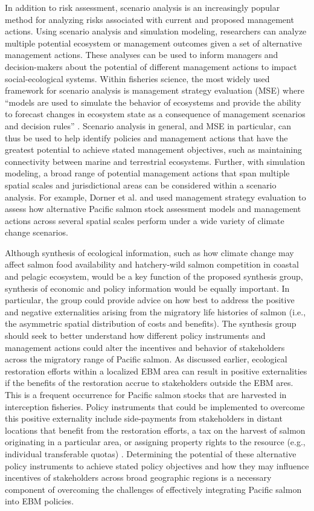 In addition to risk assessment, scenario analysis is an increasingly popular
method for analyzing risks associated with current and proposed management
actions. Using scenario analysis and simulation modeling, researchers can
analyze multiple potential ecosystem or management outcomes given a set of
alternative management actions. These analyses can be used to inform managers
and decision-makers about the potential of different management actions to
impact social-ecological systems. Within fisheries science, the most widely used
framework for scenario analysis is management strategy evaluation (MSE) where
``models are used to simulate the behavior of ecosystems and provide the ability
to forecast changes in ecosystem state as a consequence of management scenarios
and decision rules'' \citep{Levin2009}. Scenario analysis in general, and MSE in
particular, can thus be used to help identify policies and management actions
that have the greatest potential to achieve stated management objectives, such
as maintaining connectivity between marine and terrestrial ecosystems. Further,
with simulation modeling, a broad range of potential management actions that
span multiple spatial scales and jurisdictional areas can be considered within a
scenario analysis. For example, Dorner et al. \citet{Dorner2009a} and
\citet{Dorner2013} used management strategy evaluation to assess how alternative
Pacific salmon stock assessment models and management actions across several
spatial scales perform under a wide variety of climate change scenarios.

Although synthesis of ecological information, such as how climate change may
affect salmon food availability and hatchery-wild salmon competition in coastal
and pelagic ecosystem, would be a key function of the proposed synthesis group,
synthesis of economic and policy information would be equally important. In
particular, the group could provide advice on how best to address the positive
and negative externalities arising from the migratory life histories of salmon
(i.e., the asymmetric spatial distribution of costs and benefits). The synthesis
group should seek to better understand how different policy instruments and
management actions could alter the incentives and behavior of stakeholders
across the migratory range of Pacific salmon. As discussed earlier, ecological
restoration efforts within a localized EBM area can result in positive
externalities if the benefits of the restoration accrue to stakeholders outside
the EBM ares. This is a frequent occurrence for Pacific salmon stocks that are
harvested in interception fisheries. Policy instruments that could be
implemented to overcome this positive externality include side-payments from
stakeholders in distant locations that benefit from the restoration efforts, a
tax on the harvest of salmon originating in a particular area, or assigning
property rights to the resource (e.g., individual transferable quotas)
\citep{Howlett2009a}. Determining the potential of these alternative policy
instruments to achieve stated policy objectives and how they may influence
incentives of stakeholders across broad geographic regions is a necessary
component of overcoming the challenges of effectively integrating Pacific salmon
into EBM policies.


